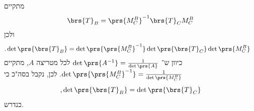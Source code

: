 \documentclass[a4paper,10pt,twoside,openany]{book}
\begin{document}
\begin{solution}
מתקיים
\begin{align*}
\brs{T}_B = \prs{M^B_C}^{-1} \brs{T}_C M^B_C
\end{align*}
ולכן
\begin{align*}
\text{.} \det\prs{\brs{T}_B} &= \det\prs{\prs{M^B_C}^{-1}} \det\prs{\brs{T}_C} \det\prs{M^B_C}
\end{align*}
כיוון ש־%
$\det\prs{A^{-1}} = \frac{1}{\det\prs{A}}$
 לכל מטריצה
 $A$,
 מתקיים
 $\det\prs{\prs{M^B_C}^{-1}} = \frac{1}{\det\prs{M^B_C}}$.
 לכן, נקבל בסה"כ כי
 \[\text{,} \det\prs{\brs{T}_B} = \det\prs{\brs{T}_C}\]
 כנדרש.
\end{solution}

\printbibliography
\end{document}
